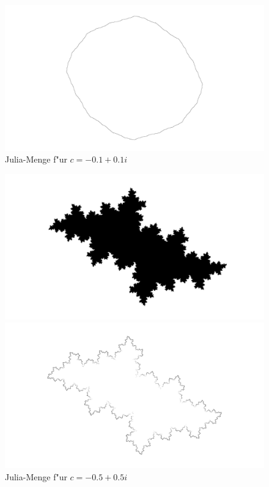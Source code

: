 \begin{refsection}
\begin{figure}
\begin{center}
\bigskip

\includegraphics[width=\hsize]{julia/j-a.png}
\end{center}
\caption{Julia-Menge f"ur $c= -0.1+0.1i$}
\end{figure}

\begin{figure}
\begin{center}
\includegraphics[width=\hsize]{julia/b.png}

\bigskip

\includegraphics[width=\hsize]{julia/j-b.png}
\end{center}
\caption{Julia-Menge f"ur $c= -0.5+0.5i$}
\end{figure}


\end{refsection}
